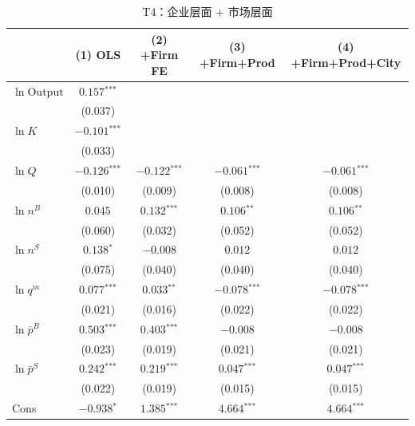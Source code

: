 \documentclass[12pt]{article}
\newcommand{\sym}[1]{\ensuremath{^{\text{#1}}}}
\newcommand{\se}[1]{{\small(#1)}}
\newcommand{\abs}{\textemdash}
\begin{document}
\begin{table}[H]
  \centering
  \caption{T4：企业层面 + 市场层面}
  \begin{threeparttable}
    \begin{tabular}{lcccc}
      \toprule
       & (1) OLS & (2) +Firm FE & (3) +Firm+Prod & (4) +Firm+Prod+City \\
      \midrule
      $\ln\mathrm{Output}$ & $0.157\sym{***}$ & \abs & \abs & \abs \\
                           & \se{0.037}       &     &     &     \\[4pt]
      $\ln K$              & $-0.101\sym{***}$ & \abs & \abs & \abs \\
                           & \se{0.033}        &     &     &     \\[4pt]
      $\ln Q$              & $-0.126\sym{***}$ & $-0.122\sym{***}$ & $-0.061\sym{***}$ & $-0.061\sym{***}$ \\
                           & \se{0.010}        & \se{0.009}        & \se{0.008}        & \se{0.008} \\[4pt]
      $\ln n^B$            & $0.045$ & $0.132\sym{***}$ & $0.106\sym{**}$  & $0.106\sym{**}$  \\
                           & \se{0.060}      & \se{0.032}       & \se{0.052} & \se{0.052} \\[4pt]
      $\ln n^S$            & $0.138\sym{*}$  & $-0.008$  & $0.012$  & $0.012$  \\
                           & \se{0.075} & \se{0.040} & \se{0.040} & \se{0.040} \\[4pt]
      $\ln q^m$            & $0.077\sym{***}$ & $0.033\sym{**}$ & $-0.078\sym{***}$ & $-0.078\sym{***}$ \\
                           & \se{0.021} & \se{0.016}       & \se{0.022}        & \se{0.022} \\[4pt]
      $\ln\bar{p}^{B}$     & $0.503\sym{***}$ & $0.403\sym{***}$ & $-0.008$  & $-0.008$  \\
                           & \se{0.023}       & \se{0.019}       & \se{0.021} & \se{0.021} \\[4pt]
      $\ln\bar{p}^{S}$     & $0.242\sym{***}$ & $0.219\sym{***}$ & $0.047\sym{***}$  & $0.047\sym{***}$  \\
                           & \se{0.022}       & \se{0.019}       & \se{0.015} & \se{0.015} \\[4pt]
      Cons               & $-0.938\sym{*}$  & $1.385\sym{***}$ & $4.664\sym{***}$ & $4.664\sym{***}$ \\

\end{tabular}
\end{threeparttable}
\end{table}
\end{document}
